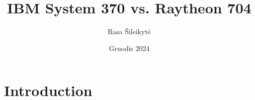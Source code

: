 \documentclass{article}
\title{IBM System 370 vs. Raytheon 704}
\author{Rasa Šileikytė}
\date{Gruodis 2024}
\begin{document}
\maketitle

\section{Introduction}
\end{document}
